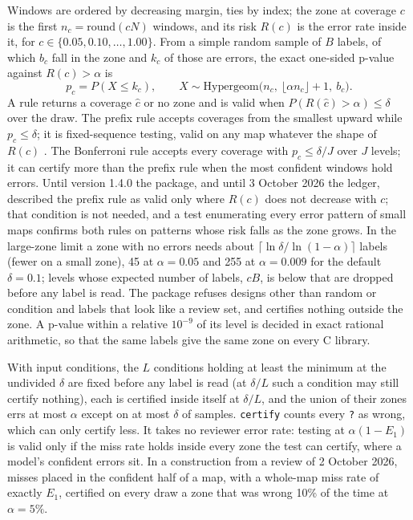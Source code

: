 \documentclass[11pt,a4paper]{article}
\newcommand{\code}[1]{\texttt{#1}}
\begin{document}
Windows are ordered by decreasing margin, ties by index; the zone at coverage $c$ is the first $n_c =
\mathrm{round}(cN)$ windows, and its risk $R(c)$ is the error rate inside it, for $c \in \{0.05, 0.10, \dots, 1.00\}$.
From a simple random sample of $B$ labels, of which $b_c$ fall in the zone and $k_c$ of those are errors, the exact
one-sided p-value against $R(c) > \alpha$ is
\begin{equation}
  p_c = P(X \le k_c), \qquad X \sim \mathrm{Hypergeom}\bigl(n_c,\ \lfloor \alpha n_c \rfloor + 1,\ b_c\bigr).
\end{equation}
A rule returns a coverage $\hat c$ or no zone and is valid when $P(R(\hat c) > \alpha) \le \delta$ over the draw. The
prefix rule accepts coverages from the smallest upward while $p_c \le \delta$; it is fixed-sequence testing, valid on
any map whatever the shape of $R(c)$ \citep{angelopoulos2021}. The Bonferroni rule accepts every coverage with
$p_c \le \delta/J$ over $J$ levels; it can certify more than the prefix rule when the most confident windows hold
errors. Until version 1.4.0 the package, and until 3 October 2026 the ledger, described the prefix rule as valid only
where $R(c)$ does not decrease with $c$; that condition is not needed, and a test enumerating every error pattern of small maps confirms both rules on
patterns whose risk falls as the zone grows. In the large-zone limit a zone with no errors needs about
$\lceil \ln\delta / \ln(1-\alpha) \rceil$ labels (fewer on a small zone), 45 at $\alpha = 0.05$ and 255 at
$\alpha = 0.009$ for the default $\delta = 0.1$; levels whose expected number of labels, $cB$, is below that are dropped
before any label is read. The package refuses designs other than random or condition and labels that look like a
review set, and certifies nothing outside the zone. A p-value within a relative $10^{-9}$ of its level is decided in exact rational arithmetic,
so that the same labels give the same zone on every C library.

With input conditions, the $L$ conditions holding at least the minimum at the undivided $\delta$ are fixed before any
label is read (at $\delta/L$ such a condition may still certify nothing), each is certified inside itself at
$\delta/L$, and the union of their zones errs at most $\alpha$ except on at most $\delta$ of
samples. \code{certify} counts every \code{?} as wrong, which can only certify less. It takes no reviewer error rate:
testing at $\alpha(1 - E_1)$ is valid only if the miss rate holds inside every zone the test can certify, where a
model's confident errors sit. In a construction from a review of 2 October 2026, misses placed in the confident half
of a map, with a whole-map miss rate of exactly $E_1$, certified on every draw a zone that was wrong 10\% of the time
at $\alpha = 5\%$.
\end{document}
